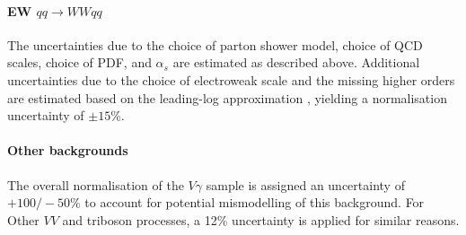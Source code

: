 \paragraph{EW $qq \to WWqq$}
The uncertainties due to the choice of parton shower model, choice of QCD scales, choice of PDF, and $\alpha_s$ are estimated as described above.
Additional uncertainties due to the choice of electroweak scale and the missing higher orders are estimated based on the leading-log approximation \cite{Denner_2019}, yielding a normalisation uncertainty of $\pm 15$\%. 




\paragraph{Other backgrounds}
The overall normalisation of the $V\gamma$ sample is assigned an uncertainty of $+100/-50\%$ to account for potential mismodelling of this background. For Other $VV$ and triboson processes, a 12\% uncertainty is applied for similar reasons. 



